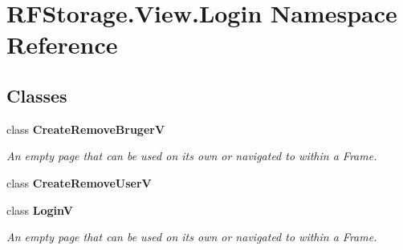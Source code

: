 \section{R\+F\+Storage.\+View.\+Login Namespace Reference}
\label{namespace_r_f_storage_1_1_view_1_1_login}
\subsection*{Classes}
\begin{DoxyCompactItemize}
\item 
class \textbf{ Create\+Remove\+BrugerV}
\begin{DoxyCompactList}\small\item\em An empty page that can be used on its own or navigated to within a Frame. \end{DoxyCompactList}\item 
class \textbf{ Create\+Remove\+UserV}
\item 
class \textbf{ LoginV}
\begin{DoxyCompactList}\small\item\em An empty page that can be used on its own or navigated to within a Frame. \end{DoxyCompactList}\end{DoxyCompactItemize}
